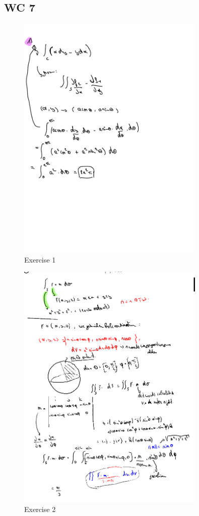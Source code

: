 \documentclass[a4paper]{report}
\begin{document}
\subsection*{WC 7}

\begin{figure}[H]
	\centering
	\includegraphics[width=0.8\textwidth]{assets/wc_7_ex_1.pdf}
	\caption{Exercise 1}
	\label{fig:wc_7_ex_1}
\end{figure}


\begin{figure}[H]
	\centering
	\includegraphics[width=0.8\textwidth]{assets/wc_7_ex_2.png}
	\caption{Exercise 2}
	\label{fig:wc_7_ex_2}
\end{figure}
\end{document}
